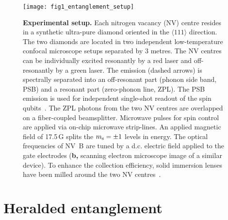 \begin{figure}[tp]
	\centering
	\texttt{[image: fig1\_entanglement\_setup]}
	\caption{\label{fig:LDE-fig1-setup} \textbf{Experimental setup.} Each nitrogen vacancy (NV) centre resides in a synthetic ultra-pure diamond oriented in the $\langle 111\rangle$ direction. The two diamonds are located in two independent low-temperature confocal microscope setups separated by 3 metres. The NV centres can be individually excited resonantly by a red laser and off-resonantly by a green laser. The emission (dashed arrows) is spectrally separated into an off-resonant part (phonon side band, PSB) and a resonant part (zero-phonon line, ZPL). The PSB emission is used for independent single-shot readout of the spin qubits~\cite{Robledo2011}. The ZPL photons from the two NV centres are overlapped on a fiber-coupled beamsplitter. Microwave pulses for spin control are applied via on-chip microwave strip-lines. An applied magnetic field of 17.5\,G splits the $m_\mathrm s = \pm1$ levels in energy. The optical frequencies of NV~B are tuned by a d.c. electric field applied to the gate electrodes (\textbf{b,} scanning electron microscope image of a similar device). To enhance the collection efficiency, solid immersion lenses have been milled around the two NV centres~\cite{Robledo2011}. }
\end{figure}

	
\section{Heralded entanglement}

